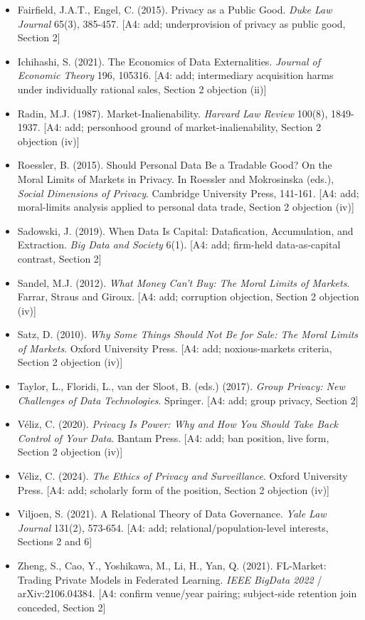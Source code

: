 \documentclass[
  11pt,
]{article}
\begin{document}
\begin{itemize}
\item
  Fairfield, J.A.T., Engel, C. (2015). Privacy as a Public Good.
  \emph{Duke Law Journal} 65(3), 385-457. {[}A4: add; underprovision of
  privacy as public good, Section 2{]}
\item
  Ichihashi, S. (2021). The Economics of Data Externalities.
  \emph{Journal of Economic Theory} 196, 105316. {[}A4: add;
  intermediary acquisition harms under individually rational sales,
  Section 2 objection (ii){]}
\item
  Radin, M.J. (1987). Market-Inalienability. \emph{Harvard Law Review}
  100(8), 1849-1937. {[}A4: add; personhood ground of
  market-inalienability, Section 2 objection (iv){]}
\item
  Roessler, B. (2015). Should Personal Data Be a Tradable Good? On the
  Moral Limits of Markets in Privacy. In Roessler and Mokrosinska
  (eds.), \emph{Social Dimensions of Privacy}. Cambridge University
  Press, 141-161. {[}A4: add; moral-limits analysis applied to personal
  data trade, Section 2 objection (iv){]}
\item
  Sadowski, J. (2019). When Data Is Capital: Datafication, Accumulation,
  and Extraction. \emph{Big Data and Society} 6(1). {[}A4: add;
  firm-held data-as-capital contrast, Section 2{]}
\item
  Sandel, M.J. (2012). \emph{What Money Can't Buy: The Moral Limits of
  Markets}. Farrar, Straus and Giroux. {[}A4: add; corruption objection,
  Section 2 objection (iv){]}
\item
  Satz, D. (2010). \emph{Why Some Things Should Not Be for Sale: The
  Moral Limits of Markets}. Oxford University Press. {[}A4: add;
  noxious-markets criteria, Section 2 objection (iv){]}
\item
  Taylor, L., Floridi, L., van der Sloot, B. (eds.) (2017). \emph{Group
  Privacy: New Challenges of Data Technologies}. Springer. {[}A4: add;
  group privacy, Section 2{]}
\item
  Véliz, C. (2020). \emph{Privacy Is Power: Why and How You Should Take
  Back Control of Your Data}. Bantam Press. {[}A4: add; ban position,
  live form, Section 2 objection (iv){]}
\item
  Véliz, C. (2024). \emph{The Ethics of Privacy and Surveillance}.
  Oxford University Press. {[}A4: add; scholarly form of the position,
  Section 2 objection (iv){]}
\item
  Viljoen, S. (2021). A Relational Theory of Data Governance. \emph{Yale
  Law Journal} 131(2), 573-654. {[}A4: add; relational/population-level
  interests, Sections 2 and 6{]}
\item
  Zheng, S., Cao, Y., Yoshikawa, M., Li, H., Yan, Q. (2021). FL-Market:
  Trading Private Models in Federated Learning. \emph{IEEE BigData 2022}
  / arXiv:2106.04384. {[}A4: confirm venue/year pairing; subject-side
  retention join conceded, Section 2{]}
\end{itemize}
\end{document}
